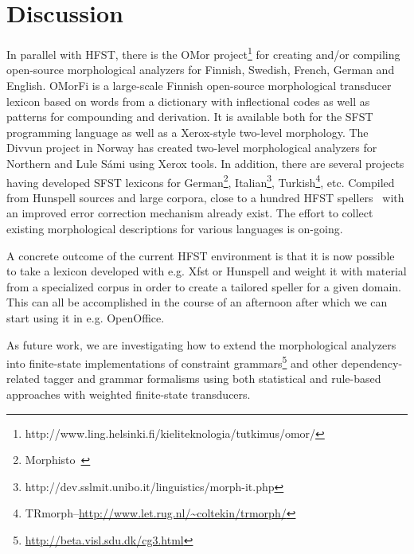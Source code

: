 \documentclass{llncs}
\begin{document}
\section{Discussion}\label{hfst:discussion}
In parallel with HFST, there is the OMor 
project\footnote{http://www.ling.helsinki.fi/kieliteknologia/tutkimus/omor/} for 
creating and/or compiling open-source morphological analyzers for Finnish, Swedish, 
French, German and English. OMorFi is a large-scale Finnish open-source morphological 
transducer lexicon based on words from a dictionary with inflectional codes as well as 
patterns for compounding and derivation. It is available both for the SFST programming 
language as well as a Xerox-style two-level morphology. The Divvun project in Norway 
has created two-level morphological analyzers for Northern and Lule Sámi using 
Xerox tools. In addition, there are several projects having developed SFST lexicons for 
German\footnote{Morphisto~\cite{zielinski/2009}}, 
Italian\footnote{http://dev.sslmit.unibo.it/linguistics/morph-it.php}, Turkish\footnote{TRmorph--\url{http://www.let.rug.nl/~coltekin/trmorph/}}, etc. 
Compiled from Hunspell sources and large corpora, close to a hundred HFST 
spellers~\cite{pirinen/2010/cla} with an improved error correction mechanism 
already exist. The effort to collect existing morphological descriptions
for various languages is on-going.

A concrete outcome of the current HFST environment is that it is now possible to take 
a lexicon developed with e.g. Xfst or Hunspell and weight it with material from a specialized corpus 
in order to create a tailored speller for a given domain. This can all be accomplished in the course 
of an afternoon after which we can start using it in e.g. OpenOffice.

As future work, we are investigating how to extend the morphological analyzers 
into finite-state implementations of constraint 
grammars\footnote{\url{http://beta.visl.sdu.dk/cg3.html}} and other 
dependency-related tagger and grammar formalisms using both statistical
and rule-based approaches with weighted finite-state transducers. 

%
%
%
\end{document}
